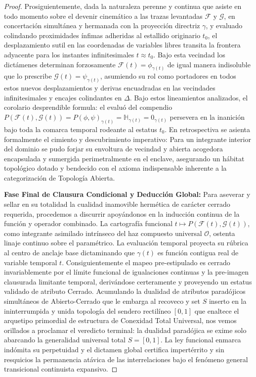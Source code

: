 \documentclass[11pt,a4paper]{article}
\theoremstyle{definition}
\theoremstyle{remark}
\numberwithin{equation}{section}
\begin{document}
\begin{proof}
Prosiguientemente, dada la naturaleza perenne y continua que asiste en todo momento sobre el devenir cinemático a las trazas levantadas $\mathcal{F}$ y $\mathcal{G}$, en concertación simultánea y hermanada con la proyección directriz $\gamma$, y evaluado colindando proximidades ínfimas adheridas al estallido originario $t_0$, el desplazamiento sutil en las coordenadas de variables libres transita la frontera adyacente para los instantes infinitesimales $t \approx t_0$. Bajo esta vecindad los dictámenes determinan forzosamente $\mathcal{F}(t) = \phi_{\gamma(t)}$ de igual manera indisoluble que lo prescribe $\mathcal{G}(t) = \psi_{\gamma(t)}$, asumiendo su rol como portadores en todos estos nuevos desplazamientos y derivas encuadradas en las vecindades infinitesimales y encajes colindantes en $\Delta$. Bajo estos lineamientos analizados, el corolario desprendible formula: el evaluó del compendio $P(\mathcal{F}(t), \mathcal{G}(t)) = P(\phi, \psi)_{\gamma(t)} = \mathbb{H}_{\gamma(t)} = 0_{\gamma(t)}$ persevera en la inanición bajo toda la comarca temporal rodeante al estatus $t_0$. En retrospectiva se asienta formalmente el cimiento y descubrimiento imperativo: Para un integrante interior del dominio se pudo forjar su envoltura de vecindad y abierta acogedora encapsulada y sumergida perimetralmente en el enclave, asegurando un hábitat topológico dotado y bendecido con el axioma indispensable inherente a la categorización de Topología Abierta.

\textbf{Fase Final de Clausura Condicional y Deducción Global:} Para aseverar y sellar en su totalidad la cualidad inamovible hermética de carácter cerrado requerida, procedemos a discurrir apoyándonos en la inducción continua de la función y operador combinado. La cartografía funcional $t \mapsto P(\mathcal{F}(t), \mathcal{G}(t))$, como integrante asimilado intrínseco del haz compuesto universal $\mathcal{O}$, ostenta linaje continuo sobre el paramétrico. La evaluación temporal proyecta su rúbrica al centro de anclaje base dictaminando que $\gamma(t)$ es función contigua real de variable temporal $t$. Consiguientemente el mapeo pre-estipulado es cerrado invariablemente por el límite funcional de igualaciones continuas y la pre-imagen clausurada limitante temporal, derivándose certeramente y proveyendo un estatus validado de atributo Cerrado.
Acumulando la dualidad de atributos paradójicos simultáneos de Abierto-Cerrado que le embarga al recoveco y set $S$ inserto en la ininterrumpida y unida topología del sendero rectilíneo $[0, 1]$ que enaltece el arquetipo primordial de estructura de Conexidad Total Universal, nos vemos orillados a proclamar el veredicto terminal: la dualidad paradójica se exime solo abarcando la generalidad universal total $S = [0, 1]$. La ley funcional enmarca indómita su perpetuidad y el dictamen global certifica impertérrito y sin resquicios la permanencia atávica de las interrelaciones bajo el fenómeno general transicional continuista expansivo.
\end{proof}
\end{document}
